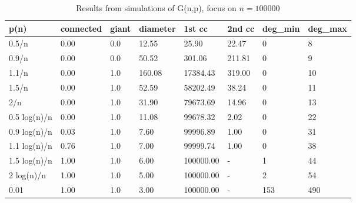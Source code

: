 \begin{table}[ht!]
	\centering
	\small
	\begin{tabular}{l|l|l|l|l|l|l|l}
		\toprule
		p(n) &  connected &  giant &  diameter &     1st cc &  2nd cc & deg\_min & deg\_max \\
		\midrule
		0.5/n &       0.00 &    0.0 &     12.55 &      25.90 &   22.47 &       0 &       8 \\
		0.9/n &       0.00 &    0.0 &     50.52 &     301.06 &  211.81 &       0 &       9 \\
		1.1/n &       0.00 &    1.0 &    160.08 &   17384.43 &  319.00 &       0 &      10 \\
		1.5/n &       0.00 &    1.0 &     52.59 &   58202.49 &   38.24 &       0 &      11 \\
		2/n &       0.00 &    1.0 &     31.90 &   79673.69 &   14.96 &       0 &      13 \\
		0.5 log(n)/n &       0.00 &    1.0 &     11.08 &   99678.32 &    2.02 &       0 &      22 \\
		0.9 log(n)/n &       0.03 &    1.0 &      7.60 &   99996.89 &    1.00 &       0 &      31 \\
		1.1 log(n)/n &       0.76 &    1.0 &      7.00 &   99999.74 &    1.00 &       0 &      38 \\
		1.5 log(n)/n &       1.00 &    1.0 &      6.00 &  100000.00 &     - &       1 &      44 \\
		2 log(n)/n &       1.00 &    1.0 &      5.00 &  100000.00 &     - &       2 &      54 \\
		0.01 &       1.00 &    1.0 &      3.00 &  100000.00 &     - &     153 &     490 \\
		\bottomrule
	\end{tabular}
\caption{Results from simulations of G(n,p), focus on $n=100000$}
\label{t:gnp_100000}
\end{table}

